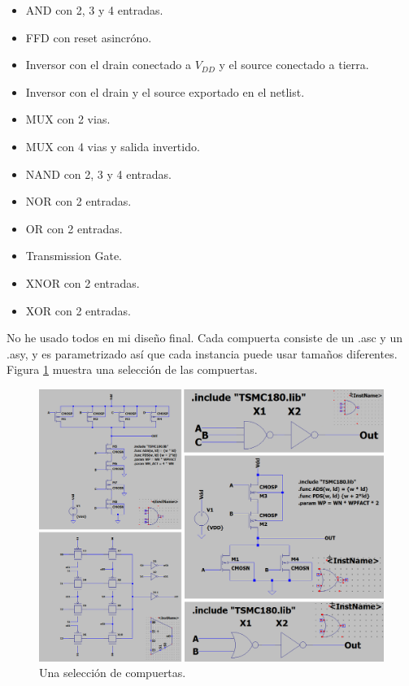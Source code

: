 \documentclass[a4paper]{article}
\begin{document}
\begin{itemize}[noitemsep]
    \item AND con 2, 3 y 4 entradas.
    \item FFD con reset asincróno.
    \item Inversor con el drain conectado a $V_{DD}$ y el source conectado a tierra.
    \item Inversor con el drain y el source exportado en el netlist.
    \item MUX con 2 vias.
    \item MUX con 4 vias y salida invertido.
    \item NAND con 2, 3 y 4 entradas.
    \item NOR con 2 entradas.
    \item OR con 2 entradas.
    \item Transmission Gate.
    \item XNOR con 2 entradas.
    \item XOR con 2 entradas.
\end{itemize}

No he usado todos en mi diseño final. Cada compuerta consiste de un .asc y un .asy, y es parametrizado así que cada instancia puede usar tamaños diferentes. Figura \ref{fig:compuertas_sch} muestra una selección de las compuertas.

\begin{figure}[!htb]
\centering
\includegraphics[scale=0.4]{./img/compuertas_sch}
\caption{Una selección de compuertas.}
\label{fig:compuertas_sch}
\end{figure}
\end{document}
